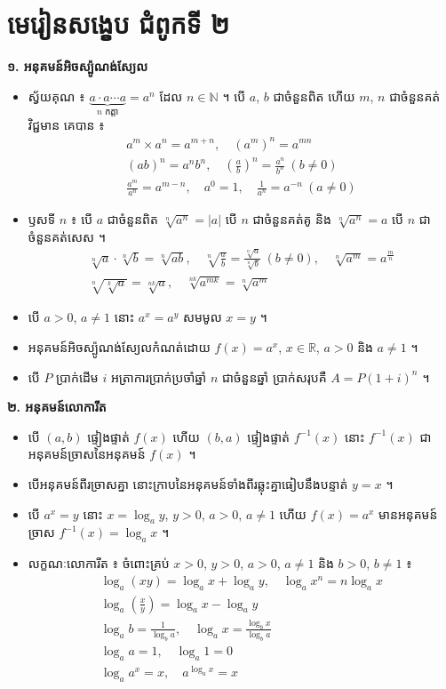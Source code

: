 \section*{មេរៀនសង្ខេប ជំពូកទី ២}
\begin{note}[មេរៀនសង្ខេប]
\textbf{១. អនុគមន៍អិចស្ប៉ូណង់ស្យែល}
\begin{itemize}
  \item ស្វ័យគុណ ៖ $\underbrace{a\cdot a\cdots a}_{n \text{ កត្តា}} = a^n$ ដែល $n \in \mathbb{N}$ ។ បើ $a$, $b$ ជាចំនួនពិត ហើយ $m$, $n$ ជាចំនួនគត់វិជ្ជមាន គេបាន ៖
  \[
  \begin{gathered}
  a^m\times a^n = a^{m+n},\quad (a^m)^n = a^{mn}\\
  (ab)^n = a^nb^n,\quad \left(\frac{a}{b}\right)^n = \frac{a^n}{b^n}\ (b \ne 0)\\
  \frac{a^m}{a^n} = a^{m-n},\quad a^0 = 1,\quad \frac{1}{a^n} = a^{-n}\ (a \ne 0)
  \end{gathered}
  \]
  \item ឫសទី $n$ ៖ បើ $a$ ជាចំនួនពិត $\sqrt[n]{a^n} = |a|$ បើ $n$ ជាចំនួនគត់គូ និង $\sqrt[n]{a^n} = a$ បើ $n$ ជាចំនួនគត់សេស ។
  \[
  \begin{gathered}
  \sqrt[n]{a}\cdot\sqrt[n]{b} = \sqrt[n]{ab},\quad \sqrt[n]{\frac{a}{b}} = \frac{\sqrt[n]{a}}{\sqrt[n]{b}}\ (b \ne 0),\quad \sqrt[n]{a^m} = a^{\frac{m}{n}}\\
  \sqrt[n]{\sqrt[k]{a}} = \sqrt[nk]{a},\quad \sqrt[nk]{a^{mk}} = \sqrt[n]{a^m}
  \end{gathered}
  \]
  \item បើ $a > 0$, $a \ne 1$ នោះ $a^x = a^y$ សមមូល $x = y$ ។
  \item អនុគមន៍អិចស្ប៉ូណង់ស្យែលកំណត់ដោយ $f(x) = a^x$, $x \in \mathbb{R}$, $a > 0$ និង $a \ne 1$ ។
  \item បើ $P$ ប្រាក់ដើម $i$ អត្រាការប្រាក់ប្រចាំឆ្នាំ $n$ ជាចំនួនឆ្នាំ ប្រាក់សរុបគឺ $A = P(1 + i)^n$ ។
\end{itemize}
\textbf{២. អនុគមន៍លោការីត}
\begin{itemize}
  \item បើ $(a, b)$ ផ្ទៀងផ្ទាត់ $f(x)$ ហើយ $(b, a)$ ផ្ទៀងផ្ទាត់ $f^{-1}(x)$ នោះ $f^{-1}(x)$ ជាអនុគមន៍ច្រាសនៃអនុគមន៍ $f(x)$ ។
  \item បើអនុគមន៍ពីរច្រាសគ្នា នោះក្រាបនៃអនុគមន៍ទាំងពីរឆ្លុះគ្នាធៀបនឹងបន្ទាត់ $y = x$ ។
  \item បើ $a^x = y$ នោះ $x = \log_a y$, $y > 0$, $a > 0$, $a \ne 1$ ហើយ $f(x) = a^x$ មានអនុគមន៍ច្រាស $f^{-1}(x) = \log_a x$ ។
  \item លក្ខណៈលោការីត ៖ ចំពោះគ្រប់ $x > 0$, $y > 0$, $a > 0$, $a \ne 1$ និង $b > 0$, $b \ne 1$ ៖
  \[
  \begin{gathered}
  \log_a(xy) = \log_a x + \log_a y,\quad \log_a x^n = n\log_a x\\
  \log_a\left(\frac{x}{y}\right) = \log_a x - \log_a y\\
  \log_a b = \frac{1}{\log_b a},\quad \log_a x = \frac{\log_b x}{\log_b a}\\
  \log_a a = 1,\quad \log_a 1 = 0\\
  \log_a a^x = x,\quad a^{\log_a x} = x
  \end{gathered}
  \]
\end{itemize}
\end{note}

